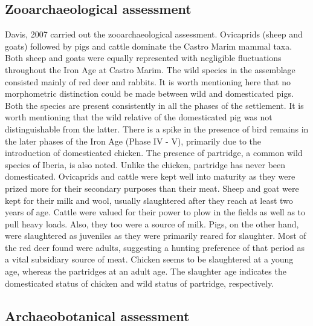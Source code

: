 \documentclass[5p]{elsarticle} %
\begin{document}
\hypertarget{zooarchaeological-assessment}{%
\subsection{Zooarchaeological assessment}\label{zooarchaeological-assessment}}

Davis, 2007 carried out the zooarchaeological assessment. Ovicaprids (sheep and goats) followed by pigs and cattle dominate the Castro Marim mammal taxa. Both sheep and goats were equally represented with negligible fluctuations throughout the Iron Age at Castro Marim. The wild species in the assemblage consisted mainly of red deer and rabbits. It is worth mentioning here that no morphometric distinction could be made between wild and domesticated pigs. Both the species are present consistently in all the phases of the settlement. It is worth mentioning that the wild relative of the domesticated pig was not distinguishable from the latter. There is a spike in the presence of bird remains in the later phases of the Iron Age (Phase IV - V), primarily due to the introduction of domesticated chicken. The presence of partridge, a common wild species of Iberia, is also noted. Unlike the chicken, partridge has never been domesticated. Ovicaprids and cattle were kept well into maturity as they were prized more for their secondary purposes than their meat. Sheep and goat were kept for their milk and wool, usually slaughtered after they reach at least two years of age. Cattle were valued for their power to plow in the fields as well as to pull heavy loads. Also, they too were a source of milk. Pigs, on the other hand, were slaughtered as juveniles as they were primarily reared for slaughter. Most of the red deer found were adults, suggesting a hunting preference of that period as a vital subsidiary source of meat. Chicken seems to be slaughtered at a young age, whereas the partridges at an adult age. The slaughter age indicates the domesticated status of chicken and wild status of partridge, respectively.

\hypertarget{archaeobotanical-assessment}{%
\subsection{Archaeobotanical assessment}\label{archaeobotanical-assessment}}
\end{document}
